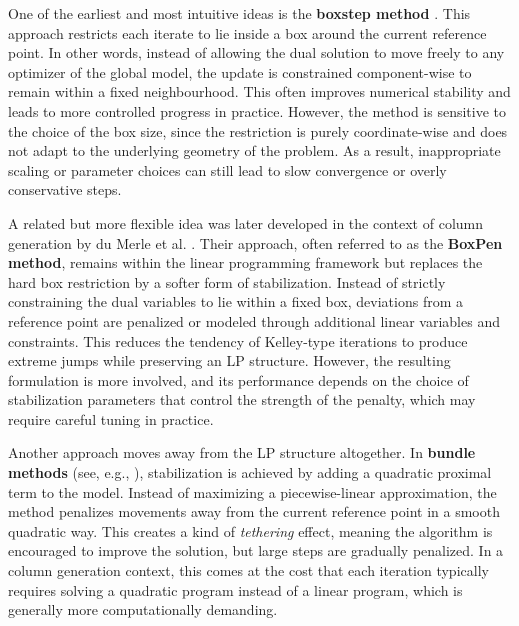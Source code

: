 \documentclass{book}
\theoremstyle{definition}
\newcounter{algorithm_}
\numberwithin{algorithm_}{chapter}
\begin{document}
One of the earliest and most intuitive ideas is the \textbf{boxstep method} \cite{marsten1975boxstep}. This approach restricts each iterate to lie inside a box around the current reference point. In other words, instead of allowing the dual solution to move freely to any optimizer of the global model, the update is constrained component-wise to remain within a fixed neighbourhood. This often improves numerical stability and leads to more controlled progress in practice. However, the method is sensitive to the choice of the box size, since the restriction is purely coordinate-wise and does not adapt to the underlying geometry of the problem. As a result, inappropriate scaling or parameter choices can still lead to slow convergence or overly conservative steps.

\bigskip

A related but more flexible idea was later developed in the context of column generation by du Merle et al. \cite{duMerle1999}. Their approach, often referred to as the \textbf{BoxPen method}, remains within the linear programming framework but replaces the hard box restriction by a softer form of stabilization. Instead of strictly constraining the dual variables to lie within a fixed box, deviations from a reference point are penalized or modeled through additional linear variables and constraints. This reduces the tendency of Kelley-type iterations to produce extreme jumps while preserving an LP structure. However, the resulting formulation is more involved, and its performance depends on the choice of stabilization parameters that control the strength of the penalty, which may require careful tuning in practice.

\bigskip

Another approach moves away from the LP structure altogether. In \textbf{bundle methods} (see, e.g., \cite{hiriarturruty1993convex, lemarechal1995new, kiwiel1990proximity}), stabilization is achieved by adding a quadratic proximal term to the model. Instead of maximizing a piecewise-linear approximation, the method penalizes movements away from the current reference point in a smooth quadratic way. This creates a kind of \textit{tethering} effect, meaning the algorithm is encouraged to improve the solution, but large steps are gradually penalized. In a column generation context, this comes at the cost that each iteration typically requires solving a quadratic program instead of a linear program, which is generally more computationally demanding.

\bigskip
\end{document}
